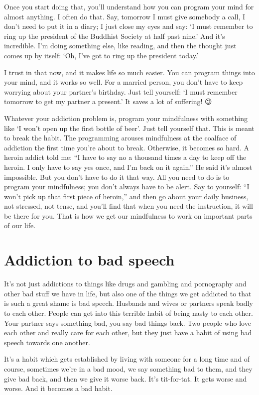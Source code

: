 \documentclass[12pt, openany]{book}
\begin{document}
Once you start doing that, you’ll understand how you can program your mind for almost anything. I often do that. Say, tomorrow I must give somebody a call, I don’t need to put it in a diary; I just close my eyes and say: ‘I must remember to ring up the president of the Buddhist Society at half past nine.’ And it’s incredible. I’m doing something else, like reading, and then the thought just comes up by itself: ‘Oh, I’ve got to ring up the president today.’ 

I trust in that now, and it makes life so much easier. You can program things into your mind, and it works so well. For a married person, you don’t have to keep worrying about your partner’s birthday. Just tell yourself: ‘I must remember tomorrow to get my partner a present.’ It saves a lot of suffering! 😉

Whatever your addiction problem is, program your mindfulness with something like ‘I won’t open up the first bottle of beer’. Just tell yourself that. This is meant to break the habit. The programming arouses mindfulness at the coalface of addiction the first time you’re about to break. Otherwise, it becomes so hard. A heroin addict told me: “I have to say no a thousand times a day to keep off the heroin. I only have to say yes once, and I’m back on it again.” He said it’s almost impossible. But you don’t have to do it that way. All you need to do is to program your mindfulness; you don’t always have to be alert. Say to yourself: “I won’t pick up that first piece of heroin,” and then go about your daily business, not stressed, not tense, and you’ll find that when you need the instruction, it will be there for you. That is how we get our mindfulness to work on important parts of our life. 

\section*{Addiction to bad speech}

It’s not just addictions to things like drugs and gambling and pornography and other bad stuff we have in life, but also one of the things we get addicted to that is such a great shame is bad speech. Husbands and wives or partners speak badly to each other. People can get into this terrible habit of being nasty to each other. Your partner says something bad, you say bad things back. Two people who love each other and really care for each other, but they just have a habit of using bad speech towards one another. 

It’s a habit which gets established by living with someone for a long time and of course, sometimes we’re in a bad mood, we say something bad to them, and they give bad back, and then we give it worse back. It’s tit-for-tat. It gets worse and worse. And it becomes a bad habit. 
\end{document}
